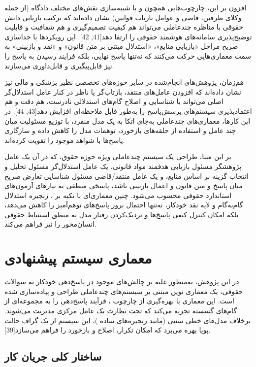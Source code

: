 \documentclass[12pt,a4paper]{report}
\begin{document}
	افزون بر این، چارچوب‌هایی همچون  و  با شبیه‌سازی نقش‌های مختلف دادگاه (از جمله وکلای طرفین، قاضی و عوامل بازیاب قوانین) نشان داده‌اند که ترکیب بازیابی دانش حقوقی با مناظره چندعاملی می‌تواند هم کیفیت تصمیم‌گیری و هم شفافیت و قابلیت توضیح‌پذیری سامانه‌های هوشمند حقوقی را ارتقا دهد[41, 42]. این رویکردها با جداسازی صریح مراحل «بازیابی منابع»، «استدلال مبتنی بر متن قانون» و «نقد و بازبینی» به سمت معماری‌هایی حرکت می‌کنند که نه‌تنها پاسخ نهایی، بلکه فرایند رسیدن به پاسخ را نیز قابل‌پیگیری و قابل‌داوری می‌سازند.
	
	هم‌زمان، پژوهش‌های انجام‌شده در سایر حوزه‌های تخصصی نظیر پزشکی و مالی نیز نشان داده‌اند که افزودن عامل‌های منتقد، بازتاب‌گر یا ناظر در کنار عامل استدلال‌گر اصلی می‌تواند با شناسایی و اصلاح گام‌های استدلالی نادرست، هم دقت و هم اعتمادپذیری سیستم‌های پرسش‌پاسخ را به‌طور قابل ملاحظه‌ای افزایش دهد[43, 44]. در این کارها، معماری‌های چندعاملی به‌جای اتکا به یک مدل منفرد، با توزیع مسئولیت میان چند عامل و استفاده از حلقه‌های بازخورد، توهمات مدل را کاهش داده و سازگاری پاسخ‌ها با شواهد موجود را تقویت کرده‌اند.
	
	بر این مبنا، طراحی یک سیستم چندعاملی ویژه حوزه حقوق، که در آن یک عامل پژوهشگر مسئول بازیابی هدفمند مواد قانونی، یک عامل استدلال‌گر مسئول تحلیل و انتخاب گزینه بر اساس منابع، و یک عامل منتقد/قاضی مسئول شناسایی تعارض صریح میان پاسخ و متن قانون و اعمال بازبینی باشد، پاسخی منطقی به نیازهای آزمون‌های استاندارد حقوقی محسوب می‌شود. چنین معماری‌ای با تکیه بر ، زنجیره استدلال گام‌به‌گام و لایه نقد خودکار، نه‌تنها احتمال بروز پاسخ‌های توهم‌آمیز را کاهش می‌دهد، بلکه امکان کنترل کیفی پاسخ‌ها و نزدیک‌کردن رفتار مدل به منطق استنباط حقوقی انسان‌محور را نیز فراهم می‌کند.
	
	\section{معماری سیستم پیشنهادی}
	
	در این پژوهش، به‌منظور غلبه بر چالش‌های موجود در پاسخ‌دهی خودکار به سوالات حقوقی، یک معماری نوین مبتنی بر سیستم‌های چندعاملی طراحی و پیاده‌سازی شده است. این معماری با بهره‌گیری از چارچوب ، فرآیند پاسخ‌دهی را به مجموعه‌ای از گام‌های گسسته تجزیه می‌کند که تحت نظارت یک عامل مرکزی مدیریت می‌شوند. برخلاف مدل‌های خطی سنتی (مانند زنجیره‌های ساده )، این سیستم از یک گراف حالت پویا  بهره می‌برد که امکان تکرار، اصلاح و بازخورد را فراهم می‌سازد[39].
	
	\subsection{ساختار کلی جریان کار}
	
\end{document}

